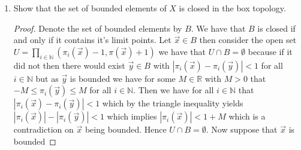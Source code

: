 \documentclass{amsart}
\theoremstyle{plain}
\theoremstyle{definition}
\theoremstyle{remark}
\begin{document}
\begin{enumerate}
\begin{proof}
    \end{proof}
    \item Show that the set of bounded elements of $X$ is closed in the box topology.
    \begin{proof}
    Denote the set of bounded elements by $B$. We have that $B$ is closed if and only if it contains it's limit points. Let $\vec{x} \in B$ then consider the open set $U=\prod_{i\in \mathbb{N}}(\pi_i(\vec{x})-1,\pi(\vec{x})+1)$ we have that $U\cap B=\emptyset$ because if it did not then there would exist $\vec{y}\in B$ with $|\pi_i(\vec{x})-\pi_i(\vec{y})|<1$ for all $i\in \mathbb{N}$ but as $\vec{y}$ is bounded we have for some $M\in \mathbb{R}$ with $M>0$ that $-M\leq \pi_i(\vec{y})\leq M$ for all $i\in \mathbb{N}$. Then we have for all $i\in \mathbb{N}$ that $|\pi_i(\vec{x})-\pi_i(\vec{y})|<1$ which by the triangle inequality yields $|\pi_i(\vec{x})|-|\pi_i(\vec{y})|<1$ which implies $|\pi_i(\vec{x})|<1+M$ which is a contradiction on $\vec{x}$ being bounded. Hence $U\cap B=\emptyset$. Now suppose that $\vec{x}$ is bounded 
    \end{proof}
        
    
\end{enumerate}
\end{document}
